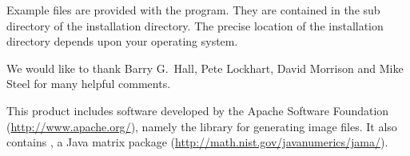 \documentclass[11pt]{article}
\begin{document}

Example files are provided with the program. They are contained in the
 sub directory of the installation directory. The precise
location of the installation directory depends upon your operating system.


We would like to thank Barry G.~Hall, Pete Lockhart, David Morrison
and Mike Steel for many helpful comments.

This product includes  software developed  by the  Apache Software Foundation
(\url{http://www.apache.org/}), namely the  library for
generating image files. It also contains , a Java matrix
package (\url{http://math.nist.gov/javanumerics/jama/}). 




\printindex
\end{document}
